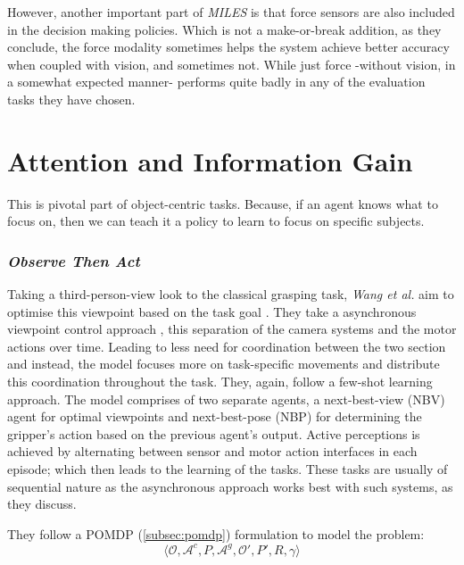 However, another important part of \emph{MILES} is that force sensors are also included in the decision making policies. Which is not a make-or-break addition, as they conclude, the force modality sometimes helps the system achieve better accuracy when coupled with vision, and sometimes not. While just force -without vision, in a somewhat expected manner- performs quite badly in any of the evaluation tasks they have chosen. 

\cite{natarajan2021graspsynthesisnovelobjects}

\section{Attention and Information Gain}
This is pivotal part of object-centric tasks. Because, if an agent knows what to focus on, then we can teach it a policy to learn to focus on specific subjects.

\subsubsection{\emph{Observe Then Act}}
Taking a third-person-view look to the classical grasping task, \emph{Wang et al.} aim to optimise this viewpoint based on the task goal \cite{wang2024observeactasynchronousactive}. They take a asynchronous viewpoint control approach , this separation of the camera systems and the motor actions over time. Leading to less need for coordination between the two section and instead, the model focuses more on task-specific movements and distribute this coordination throughout the task. 
They, again, follow a few-shot learning approach. The model comprises of two separate agents, a next-best-view (NBV) agent for optimal viewpoints and next-best-pose (NBP) for determining the gripper's action based on the previous agent's output. Active perceptions is achieved by alternating between sensor and motor action interfaces in each episode; which then leads to the learning of the tasks. These tasks are usually of sequential nature as the asynchronous approach works best with such systems, as they discuss.

They follow a POMDP (\ref{subsec:pomdp}) formulation to model the problem:
\[
  \langle \mathcal{O}, \mathcal{A}^c, P, \mathcal{A}^g, \mathcal{O}', P', R, \gamma \rangle
\]

